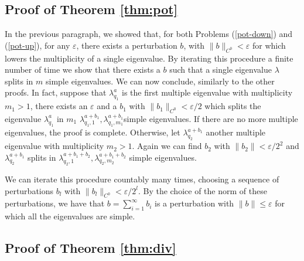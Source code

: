 \documentclass[a4paper,reqno,11pt,oneside]{amsart}
\theoremstyle{plain}
\theoremstyle{plain}
\theoremstyle{plain}
\theoremstyle{remark}
\begin{document}
\subsection{Proof of Theorem \ref{thm:pot}}

In the previous paragraph, we showed that, for both Problems (\ref{pot-down}) and (\ref{pot-up}), for any $\varepsilon$, there exists a perturbation $b$, with $\|b\|_{C^0}<\varepsilon$ 
for which lowers the multiplicity of a single eigenvalue. 
By iterating this procedure a finite number of time we show that there exists a $b$ such that a single eigenvalue $\lambda$ splits in $m$ simple eigenvalues. 
We can now conclude, similarly to the other proofs. In fact, suppose that $\lambda^a_{q_1}$ is the first multiple eigenvalue with multiplicity $m_1>1$, there exists an $\varepsilon$ and a $b_1$ with $\|b_1\|_{C^0}<\varepsilon/2$ which splits the eigenvalue $\lambda^a_{q_1}$ in $m_1$ $\lambda^{a+b_1}_{q_1,1}, \lambda^{a+b_1}_{q_1,m_1} $simple eigenvalues.
If there are no more multiple eigenvalues, the proof is complete. 
Otherwise, let  $\lambda^{a+b_1}_{q_2}$ another multiple eigenvalue with multiplicity $m_2>1$. 
Again we can find $b_2$ with $\|b_2\|<\varepsilon/2^2$ and $\lambda^{a+b_1}_{q_2}$ splits in 
$\lambda^{a+b_1+b_2}_{q_2,1}, \lambda^{a+b_1+b_2}_{q_2,m_2} $ simple eigenvalues.

We can iterate this procedure countably many times, choosing a sequence of perturbations $b_l$ 
with $\|b_l\|_{C^0}<\varepsilon/2^l$. By the choice of the norm of these perturbations, 
we have that $b=\sum_{i=1}^{\infty} b_i$ is a perturbation with $\|b\|\le \varepsilon$ 
for which all the eigenvalues are simple.


\subsection{Proof of Theorem \ref{thm:div}}
\end{document}
